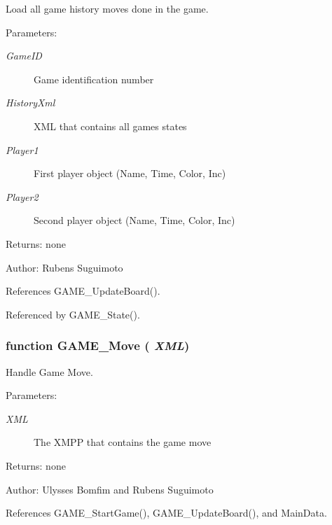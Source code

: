 Load all game history moves done in the game. 

\begin{Desc}
\item[Parameters:]
\begin{description}
\item[{\em GameID}]Game identification number \item[{\em HistoryXml}]XML that contains all games states \item[{\em Player1}]First player object (Name, Time, Color, Inc) \item[{\em Player2}]Second player object (Name, Time, Color, Inc) \end{description}
\end{Desc}
\begin{Desc}
\item[Returns:]none \end{Desc}
\begin{Desc}
\item[Author:]Rubens Suguimoto \end{Desc}


References GAME\_\-UpdateBoard().

Referenced by GAME\_\-State().
\subsubsection[GAME\_\-Move]{\setlength{\rightskip}{0pt plus 5cm}function GAME\_\-Move ( {\em XML})}\label{game_2game_8js_b5ee71873dd8a6c90f56d6257f103cf1}


Handle Game Move. 

\begin{Desc}
\item[Parameters:]
\begin{description}
\item[{\em XML}]The XMPP that contains the game move \end{description}
\end{Desc}
\begin{Desc}
\item[Returns:]none \end{Desc}
\begin{Desc}
\item[Author:]Ulysses Bomfim and Rubens Suguimoto \end{Desc}


References GAME\_\-StartGame(), GAME\_\-UpdateBoard(), and MainData.

